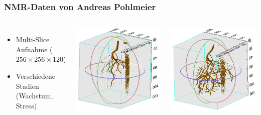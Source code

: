 \documentclass[final,ngerman,ignorenonframetext,compress]{beamer}
\begin{document}
\begin{frame}
	\frametitle{NMR-Daten von Andreas Pohlmeier}
	\begin{columns}
		\begin{itemize}
			\item Multi-Slice Aufnahme ($256\times256\times120$)
			\item Verschiedene Stadien (Wachstum, Stress)
		\end{itemize}
		\vspace{1cm}

		\begin{center}
			\includegraphics[width=.7\linewidth]{img/d1}
		\end{center}
		\begin{center}
			\includegraphics[width=.7\linewidth]{img/d2}\\

\end{center}
\end{columns}
\end{frame}
\end{document}
